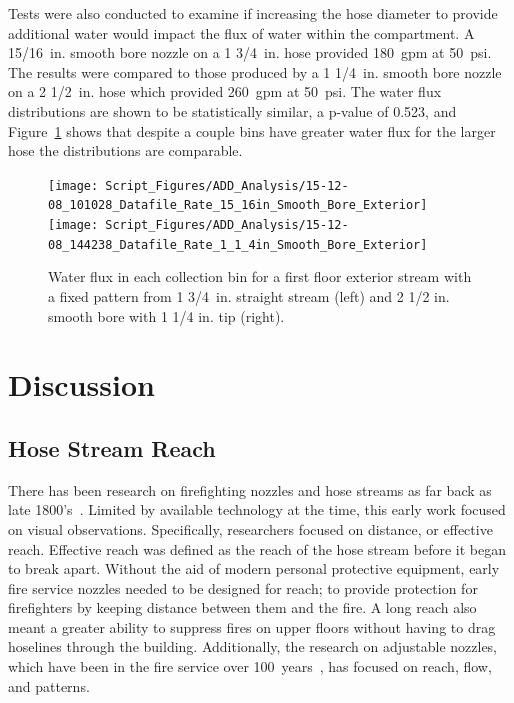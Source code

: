 \documentclass[12pt,oneside]{book}
\begin{document}
\clearpage

Tests were also conducted to examine if increasing the hose diameter to provide additional water would impact the flux of water within the compartment. A 15/16~in. smooth bore nozzle on a 1 3/4~in. hose provided 180~gpm at 50~psi. The results were compared to those produced by a 1 1/4~in. smooth bore nozzle on a 2 1/2~in. hose which provided 260~gpm at 50~psi. The water flux distributions are shown to be statistically similar, a p-value of 0.523, and Figure~\ref{fig:Exterior_First_Floor_Varying_Hose_Size} shows that despite a couple bins have greater water flux for the larger hose the distributions are comparable.

\begin{figure}[ht]
\texttt{[image: Script\_Figures/ADD\_Analysis/15-12-08\_101028\_Datafile\_Rate\_15\_16in\_Smooth\_Bore\_Exterior]}
\texttt{[image: Script\_Figures/ADD\_Analysis/15-12-08\_144238\_Datafile\_Rate\_1\_1\_4in\_Smooth\_Bore\_Exterior]} \\ 
\caption[Water Flux Varying Hose Size]{Water flux in each collection bin for a first floor exterior stream with a fixed pattern from 1 3/4~in. straight stream (left) and 2 1/2 in. smooth bore with 1 1/4 in. tip (right).}
\label{fig:Exterior_First_Floor_Varying_Hose_Size}
\end{figure}

\chapter{Discussion}

\section{Hose Stream Reach}
\label{sec:hose_reach}
There has been research on firefighting nozzles and hose streams as far back as late 1800's~\cite{CHICAGO_TRIBUNE:1339:a}. Limited by available technology at the time, this early work focused on visual observations. Specifically, researchers focused on distance, or effective reach. Effective reach was defined as the reach of the hose stream before it began to break apart. Without the aid of modern personal protective equipment, early fire service nozzles needed to be designed for reach; to provide protection for firefighters by keeping distance between them and the fire. A long reach also meant a greater ability to suppress fires on upper floors without having to drag hoselines through the building. Additionally, the research on adjustable nozzles, which have been in the fire service over 100~years~\cite{PALMER:1878}, has focused on reach, flow, and patterns. 
\end{document}
